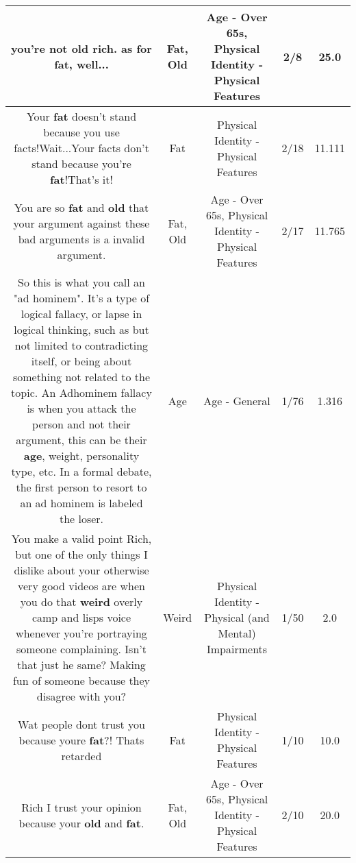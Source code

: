 \documentclass[11pt]{article}
\newlength\mylength
\begin{document}
\begin{center}
\begin{longtable}{|C{.65\mylength}|C{.30\mylength}|C{.12\mylength}|C{.12\mylength}|C{.12\mylength}|}
  \small you're not \textbf{old} rich. as for \textbf{fat}, well...\normalsize   & Fat, Old & Age - Over 65s, Physical Identity - Physical Features & 2/8 & 25.0 \\  \hline
  \small Your \textbf{fat} doesn't stand because you use facts!Wait...Your facts don't stand because you're \textbf{fat}!That's it!\normalsize   & Fat & Physical Identity - Physical Features & 2/18 & 11.111 \\  \hline
  \small You are so \textbf{fat} and \textbf{old} that your argument against these bad arguments is a invalid argument.\normalsize   & Fat, Old & Age - Over 65s, Physical Identity - Physical Features & 2/17 & 11.765 \\  \hline
  \small So this is what you call an "ad hominem".  It's a type of logical fallacy, or lapse in logical thinking, such as but not limited to contradicting itself, or being about something not related to the topic.  An Adhominem fallacy is when you attack the person and not their argument, this can be their \textbf{age}, weight, personality type, etc.  In a formal debate, the first person to resort to an ad hominem is labeled the loser.\normalsize   & Age & Age - General & 1/76 & 1.316 \\  \hline
  \small You make a valid point Rich, but one of the only things I dislike about your otherwise very good videos are when you do that \textbf{weird} overly camp and lisps voice whenever you're portraying someone complaining. Isn't that just he same? Making fun of someone because they disagree with you?\normalsize   & Weird & Physical Identity - Physical (and Mental) Impairments & 1/50 & 2.0 \\  \hline
  \small Wat people dont trust you because youre \textbf{fat}?! Thats retarded\normalsize   & Fat & Physical Identity - Physical Features & 1/10 & 10.0 \\  \hline
  \small Rich I trust your opinion because your \textbf{old} and \textbf{fat}.\normalsize   & Fat, Old & Age - Over 65s, Physical Identity - Physical Features & 2/10 & 20.0 \\  \hline

\end{longtable}
\end{center}
\end{document}
